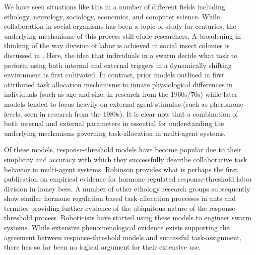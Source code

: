 \documentclass{nature}
\begin{document}
We have seen situations like this in a number of different fields including ethology, neurology, sociology, economics, and computer science. While collaboration in social organisms has been a topic of study for centuries, the underlying mechanisms of this process still elude researchers. A broadening in thinking of the way division of labor is achieved in social insect colonies is discussed in \cite{Gordon1996}. Here, the idea that individuals in a swarm decide what task to perform using both internal and external triggers in a dynamically shifting environment is first cultivated. In contrast, prior models outlined in \cite{Gordon1996} first attributed task allocation mechanisms to innate physiological differences in individuals (such as age and size, in research from the 1960s/70s) while later models tended to focus heavily on external agent stimulus (such as pheromone levels, seen in research from the 1980s). It is clear now that a combination of both internal and external parameters in essential for understanding the underlying mechanisms governing task-allocation in multi-agent systems. 

Of these models, response-threshold models have become popular due to their simplicity and accuracy with which they successfully describe collaborative task behavior in multi-agent systems. Robinson \cite{Robinson1987} provides what is perhaps the first publication on empirical evidence for hormone regulated response-threshold labor division in honey bees. A number of other ethology research groups subsequently show similar hormone regulation based task-allocation processes in ants and termites providing further evidence of the ubiquitous nature of the response-threshold process. Roboticists have started using these models to engineer swarm systems. While extensive phenomenological evidence exists supporting the agreement between response-threshold models and successful task-assignment, there has so far been no logical argument for their extensive use.


\end{document}
